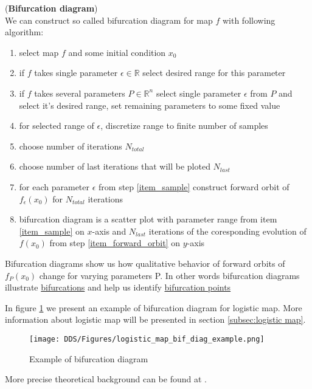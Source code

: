 \begin{definition} (\textbf{Bifurcation diagram}) \\
    \label{def: bif_diag}
    We can construct so called bifurcation diagram for map $f$ with following algorithm:
    \begin{enumerate}
        \item select map $f$ and some initial condition $x_0$
        \item if $f$ takes single parameter $\epsilon \in \mathbb{R}$ select desired range for this parameter
        \item if $f$ takes several parameters $P \in \mathbb{R}^n$ select single parameter $\epsilon$ from $P$ and select it's desired range, set remaining parameters to some fixed value
        \item for selected range of $\epsilon$, discretize range to finite number of samples \label{item_sample}
        \item choose number of iterations $N_{total}$
        \item choose number of last iterations that will be ploted $N_{last}$
        \item for each parameter $\epsilon$ from step \ref{item_sample} construct forward orbit of $f_{\epsilon}(x_0)$ for $N_{total}$ iterations \label{item_forward_orbit}
        \item bifurcation diagram is a scatter plot with parameter range from item \ref{item_sample} on $x$-axis and $N_{last}$ iterations of the coresponding evolution of $f(x_0)$ from step \ref{item_forward_orbit} on $y$-axis
    \end{enumerate}
\end{definition}

\begin{remark}
    Bifurcation diagrams show us how qualitative behavior of forward orbits of $f_P(x_0)$ change for varying parameters P.
    In other words bifurcation diagrams illustrate \hyperref[def:bifurcation]{bifurcations} and help us identify \hyperref[def:bifurcation_point]{bifurcation points}
\end{remark}

\begin{example}
    In figure \ref{fig:bif_diag_example} we present an example of bifurcation diagram for logistic map. More information about logistic map will be presented in section \ref{subsec:logistic map}.
    \begin{figure}[!h]
        \centering
        \texttt{[image: DDS/Figures/logistic\_map\_bif\_diag\_example.png]}
        \caption{Example of bifurcation diagram}
        \label{fig:bif_diag_example}
    \end{figure}
\end{example}

More precise theoretical background can be found at \cite{Devaney20211026,Elaskar2017,Lynch2014}.

\endinput